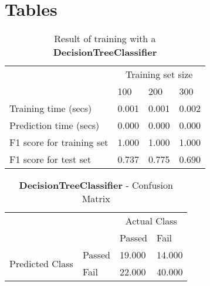 \documentclass[12pt]{article}
\begin{document}

\section*{Tables}

\setlength{\extrarowheight}{1.5pt}
\begin{table}[!htbp]
\caption{Result of training with a \textbf{DecisionTreeClassifier}} %
\centering %
\begin{tabular}{|p{6cm}|p{1.5cm}|p{1.5cm}|p{1.5cm}|} %
\hline %
& \multicolumn{3}{c|}{Training set size}\\[5pt]
\cline{2-4} 
& 100 & 200 & 300\\[0.5ex]
\hline %

Training time (secs)   &       0.001 & 0.001 & 0.002 \\
Prediction time (secs)   &     0.000 & 0.000 & 0.000 \\
F1 score for training set  &   1.000 & 1.000 & 1.000 \\
F1 score for test set    &     0.737 & 0.775 & 0.690 \\
\hline %
\end{tabular}
\label{decisionTreeTable}
\end{table}


\setlength{\extrarowheight}{1.5pt}
\begin{table}[!htbp]
\caption{\textbf{DecisionTreeClassifier} - Confusion Matrix} %
\centering %
\begin{tabular}{ |l|l|p{3cm}|p{3cm}| }
\hline %
\multirow{2}{*}{} & & \multicolumn{2}{c|}{Actual Class} \\ 
\cline{3-4}
\multirow{2}{*}{} & & Passed & Fail \\ 
\hline
\multirow{2}{1.5in}{Predicted Class} & Passed & 19.000 & 14.000 \\ 
 & Fail & 22.000 & 40.000  \\ \hline
\end{tabular}
\label{decisionTreeConfusionMatrix}
\end{table}
\end{document}
